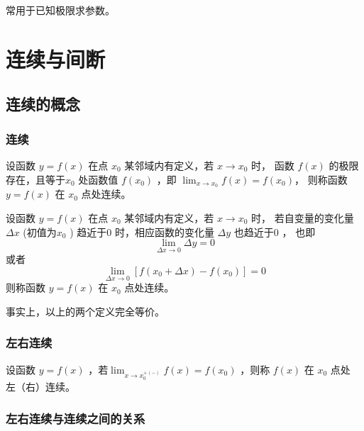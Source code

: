 常用于已知极限求参数。


\section{连续与间断}

\subsection{连续的概念}

\subsubsection{连续}

\begin{Def}[连续]

    设函数 $ y=f(x) $ 在点 $ x_0 $ 某邻域内有定义，若 $ x\rightarrow x_0 $ 时，
    函数 $ f(x) $ 的极限存在，且等于$ x_0 $ 处函数值 $ f(x_0) $ ，即 $ {\displaystyle\lim_{x\rightarrow x_0}}f(x)=f(x_0) $，
    则称函数 $ y=f(x) $ 在 $ x_0 $ 点处连续。
\end{Def}

\begin{Def}[连续]

    设函数 $ y=f(x) $ 在点 $ x_0 $ 某邻域内有定义，若 $ x\rightarrow x_0 $ 时，
    若自变量的变化量 $ \Delta x $ (初值为$ x_0 $ ) 趋近于$ 0 $ 时，相应函数的变化量 $ \Delta y $ 也趋近于$ 0 $ ，
    也即 $$ {\displaystyle\lim_{\Delta x\rightarrow 0}}\Delta y=0 $$ 或者 $$
        {\displaystyle\lim_{\Delta x\rightarrow 0}}[f(x_0+\Delta x)-f(x_0)]=0
    $$ 
    则称函数 $ y=f(x) $ 在 $ x_0 $ 点处连续。
\end{Def}

事实上，以上的两个定义完全等价。

\subsubsection{左右连续}

\begin{Def}[左、右连续的定义]

    设函数 $ y=f(x) $ ，若$ {\displaystyle\lim_{x\rightarrow x_0^{+(-)}}}f(x)=f(x_0) $ ，则称 $ f(x) $ 在 $ x_0 $ 点处
    左（右）连续。
\end{Def}

\subsubsection{左右连续与连续之间的关系}

